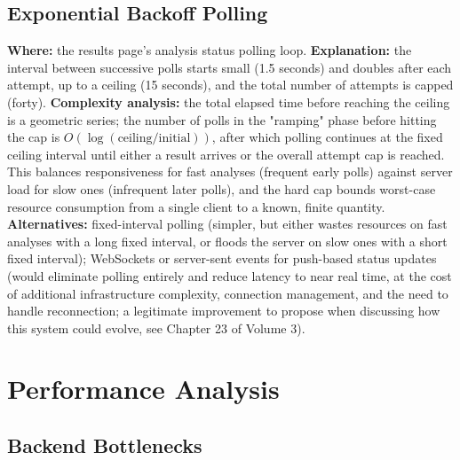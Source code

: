 \documentclass[11pt,a4paper]{report}
\begin{document}
\section{Exponential Backoff Polling}

\textbf{Where:} the results page's analysis status polling loop.
\textbf{Explanation:} the interval between successive polls starts small (1.5 seconds) and doubles after each attempt, up to a ceiling (15 seconds), and the total number of attempts is capped (forty).
\textbf{Complexity analysis:} the total elapsed time before reaching the ceiling is a geometric series; the number of polls in the "ramping" phase before hitting the cap is $O(\log(\text{ceiling}/\text{initial}))$, after which polling continues at the fixed ceiling interval until either a result arrives or the overall attempt cap is reached. This balances responsiveness for fast analyses (frequent early polls) against server load for slow ones (infrequent later polls), and the hard cap bounds worst-case resource consumption from a single client to a known, finite quantity.
\textbf{Alternatives:} fixed-interval polling (simpler, but either wastes resources on fast analyses with a long fixed interval, or floods the server on slow ones with a short fixed interval); WebSockets or server-sent events for push-based status updates (would eliminate polling entirely and reduce latency to near real time, at the cost of additional infrastructure complexity, connection management, and the need to handle reconnection; a legitimate improvement to propose when discussing how this system could evolve, see Chapter 23 of Volume 3).

\chapter{Performance Analysis}

\section{Backend Bottlenecks}
\end{document}
